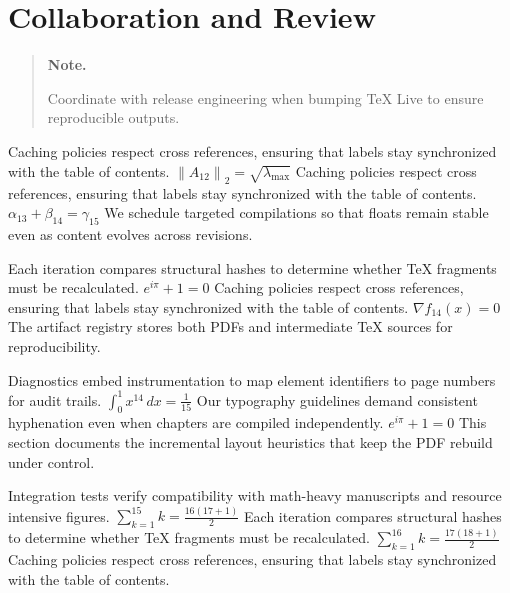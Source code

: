 \documentclass[12pt,a4paper,twocolumn]{article}
\newcommand{\paraid}[1]{\par\noindent\hypertarget{#1}{\ignorespaces}}
\begin{document}
\section{Collaboration and Review}
\label{sec11}

\begin{quote}
\hypertarget{sec11-note}{\textbf{Note.}} 
      Coordinate with release engineering when bumping TeX Live to ensure reproducible outputs.
    
\end{quote}

\paraid{sec11-p1}Caching policies respect cross references, ensuring that labels stay synchronized with the table of contents. $\left\|A_{12}\right\|_{2} = \sqrt{\lambda_{\max}}$ Caching policies respect cross references, ensuring that labels stay synchronized with the table of contents. $\alpha_{13} + \beta_{14} = \gamma_{15}$ We schedule targeted compilations so that floats remain stable even as content evolves across revisions.
\par

\paraid{sec11-p2}Each iteration compares structural hashes to determine whether TeX fragments must be recalculated. $e^{i\pi} + 1 = 0$ Caching policies respect cross references, ensuring that labels stay synchronized with the table of contents. $\nabla f_{14}(x) = 0$ The artifact registry stores both PDFs and intermediate TeX sources for reproducibility.
\par

\paraid{sec11-p3}Diagnostics embed instrumentation to map element identifiers to page numbers for audit trails. $\int_{0}^{1} x^{14} \, dx = \frac{1}{15}$ Our typography guidelines demand consistent hyphenation even when chapters are compiled independently. $e^{i\pi} + 1 = 0$ This section documents the incremental layout heuristics that keep the PDF rebuild under control.
\par

\paraid{sec11-p4}Integration tests verify compatibility with math-heavy manuscripts and resource intensive figures. $\sum_{k=1}^{15} k = \frac{16(17+1)}{2}$ Each iteration compares structural hashes to determine whether TeX fragments must be recalculated. $\sum_{k=1}^{16} k = \frac{17(18+1)}{2}$ Caching policies respect cross references, ensuring that labels stay synchronized with the table of contents.
\par
\end{document}
